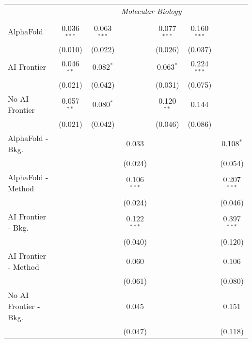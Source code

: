 \begin{tabular}{lcccccc}
 & \multicolumn{6}{c}{\textit{Molecular Biology}} \\ \\
   AlphaFold               & 0.036$^{***}$ & 0.063$^{***}$ &               & 0.077$^{***}$ & 0.160$^{***}$ &   \\   
                           & (0.010)       & (0.022)       &               & (0.026)       & (0.037)       &   \\   
   AI Frontier             & 0.046$^{**}$  & 0.082$^{*}$   &               & 0.063$^{*}$   & 0.224$^{***}$ &   \\   
                           & (0.021)       & (0.042)       &               & (0.031)       & (0.075)       &   \\   
   No AI Frontier          & 0.057$^{**}$  & 0.080$^{*}$   &               & 0.120$^{**}$  & 0.144         &   \\   
                           & (0.021)       & (0.042)       &               & (0.046)       & (0.086)       &   \\   
   AlphaFold - Bkg.        &               &               & 0.033         &               &               & 0.108$^{*}$\\   
                           &               &               & (0.024)       &               &               & (0.054)\\   
   AlphaFold - Method      &               &               & 0.106$^{***}$ &               &               & 0.207$^{***}$\\   
                           &               &               & (0.024)       &               &               & (0.046)\\   
   AI Frontier - Bkg.      &               &               & 0.122$^{***}$ &               &               & 0.397$^{***}$\\   
                           &               &               & (0.040)       &               &               & (0.120)\\   
   AI Frontier - Method    &               &               & 0.060         &               &               & 0.106\\   
                           &               &               & (0.061)       &               &               & (0.080)\\   
   No AI Frontier - Bkg.   &               &               & 0.045         &               &               & 0.151\\   
                           &               &               & (0.047)       &               &               & (0.118)\\   

\end{tabular}
